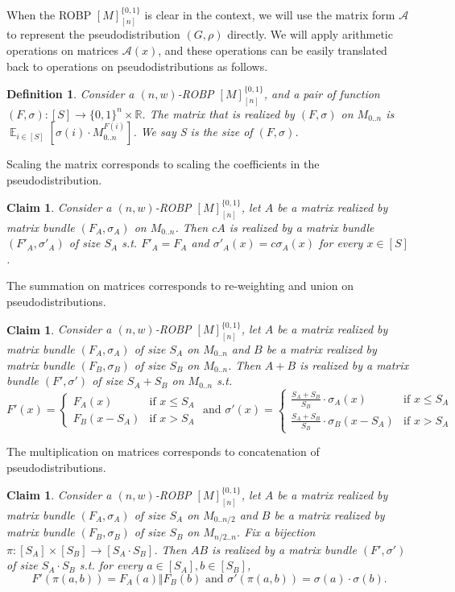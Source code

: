 \documentclass[10pt,a4paper]{article}
\newtheorem{definition}[theorem]{Definition}
\newtheorem{claim}[theorem]{Claim}
\DeclareMathOperator*{\Ex}{\mathbb E}
\newcommand{\ex}[2][]{\Ex_{#1}\left[#2\right]}
\newcommand{\bbR}{\mathbb R}
\newcommand{\cA}{\mathcal A}
\newcommand{\bits}[1]{\{0,1\}^{#1}}
\newcommand{\bit}{\{0,1\}}
\begin{document}
When the ROBP $[M]_{[n]}^{\bit}$ is clear in the context, we will use the matrix form $\cA$ to represent the pseudodistribution $(G,\rho)$ directly. We will apply arithmetic operations on matrices $\cA(x)$, and these operations can be easily translated back to operations on pseudodistributions as follows.
\begin{definition}
Consider a $(n,w)$-ROBP $[M]_{[n]}^{\bit}$, and a pair of function $(F,\sigma):[S]\to \bits{n}\times\bbR$. The matrix that is \emph{realized} by $(F,\sigma)$ on $M_{0..n}$ is $\ex[{i\in[S]}]{\sigma(i)\cdot M_{0..n}^{F(i)}}$. We say S is the \emph{size} of $(F,\sigma)$.
\end{definition}
\noindent
Scaling the matrix corresponds to scaling the coefficients in the pseudodistribution.
\begin{claim}
Consider a $(n,w)$-ROBP $[M]_{[n]}^{\bit}$, let $A$ be a matrix realized by matrix bundle $(F_A,\sigma_A)$ on $M_{0..n}$. Then $cA$ is realized by a matrix bundle $(F'_A,\sigma'_A)$ of size $S_A$ s.t. $F'_A=F_A$ and $\sigma'_A(x)=c\sigma_A(x)$ for every $x\in[S]$.
\end{claim}
\noindent
The summation on matrices corresponds to re-weighting and union on pseudodistributions.
\begin{claim}
Consider a $(n,w)$-ROBP $[M]_{[n]}^{\bit}$, let $A$ be a matrix realized by matrix bundle $(F_A,\sigma_A)$ of size $S_A$ on $M_{0..n}$ and $B$ be a matrix realized by matrix bundle $(F_B,\sigma_B)$ of size $S_B$ on $M_{0..n}$. Then $A+B$ is realized by a matrix bundle $(F',\sigma')$ of size $S_A+S_B$ on $M_{0..n}$ s.t. 
\[
F'(x) = \begin{cases} F_A(x) &\mbox{if } x \le S_A \\
F_B(x-S_A) & \mbox{if }  x > S_A \end{cases}\textrm{ and }
\sigma'(x) = \begin{cases} \frac{S_A+S_B}{S_B}\cdot \sigma_A(x) &\mbox{if } x \le S_A \\
\frac{S_A+S_B}{S_B}\cdot \sigma_B(x-S_A) & \mbox{if }  x > S_A \end{cases}
\]
\end{claim}
\noindent
The multiplication on matrices corresponds to concatenation of pseudodistributions.
\begin{claim}
Consider a $(n,w)$-ROBP $[M]_{[n]}^{\bit}$, let $A$ be a matrix realized by matrix bundle $(F_A,\sigma_A)$ of size $S_A$ on $M_{0..n/2}$ and $B$ be a matrix realized by matrix bundle $(F_B,\sigma_B)$ of size $S_B$ on $M_{n/2..n}$. Fix a bijection $\pi:[S_A]\times[S_B]\to{[S_A\cdot S_B]}$. Then $AB$ is realized by a matrix bundle $(F',\sigma')$ of size $S_A\cdot S_B$ s.t. for every $a\in[S_A],b\in[S_B]$,
$$F'(\pi(a,b))=F_A(a)\Vert F_B(b)\textrm{ and }\sigma'(\pi(a,b))=\sigma(a)\cdot \sigma(b).$$
\end{claim}
\end{document}
